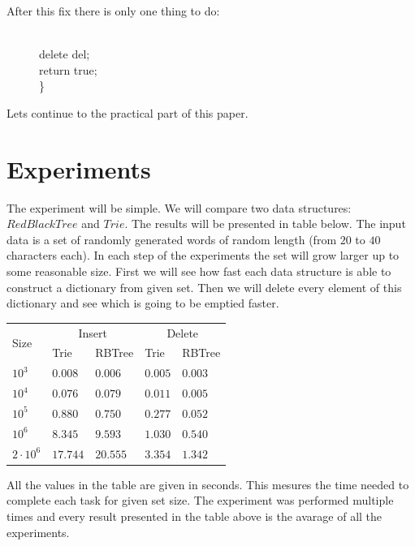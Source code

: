 \documentclass[a4paper,12pt]{article}
\begin{document}
\noindent After this fix there is only one thing to do:

\newpage

\begin{figure}[!h]
\begin{tabbing}
\quad \quad \= \\
\>  delete del; \\
\>  return true; \\
\} \\
\end{tabbing}
\end{figure}

\noindent Lets continue to the practical part of this paper.

\section{Experiments}

The experiment will be simple. We will compare two data structures: $RedBlackTree$ and $Trie$. The results will be presented in table below. The input data is a set of randomly generated words of random length (from $20$ to $40$ characters each). In each step of the experiments the set will grow larger up to some reasonable size. First we will see how fast each data structure is able to construct a dictionary from given set. Then we will delete every element of this dictionary and see which is going to be emptied faster.

\begin{center}
\begin{tabular}{|l|l|l|l|l|} \hline
\multirow{2}{*}{Size} & \multicolumn{2}{|c|}{Insert} & \multicolumn{2}{|c|}{Delete} \\ \cline{2-5}
& Trie & RBTree & Trie & RBTree \\ \hline
$10^3$ 				& $0.008$  & $0.006$  & $0.005$ & $0.003$ \\ \hline
$10^4$ 				& $0.076$  & $0.079$  & $0.011$ & $0.005$ \\ \hline
$10^5$ 				& $0.880$  & $0.750$  & $0.277$ & $0.052$ \\ \hline
$10^6$ 				& $8.345$  & $9.593$  & $1.030$ & $0.540$ \\ \hline
$2\cdot 10^6$ & $17.744$ & $20.555$ & $3.354$ & $1.342$ \\ \hline
\end{tabular}
\end{center}

All the values in the table are given in seconds. This mesures the time needed to complete each task for given set size. The experiment was performed multiple times and every result presented in the table above is the avarage of all the experiments.
\end{document}

